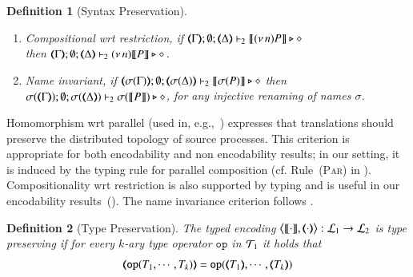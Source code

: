 \documentclass[preprint,11pt]{elsarticle}
\newtheorem{definition}{Definition}[section]
\begin{document}
{{\begin{definition}[Syntax Preservation]
\begin{enumerate}[1.]
		\item	\emph{Compositional wrt restriction},  if 
		$\mapt{\Gamma}; \emptyset; \mapt{\Delta} \proves_2 \map{\news{n}P} \hastype \Proc$ \\
		then 
		$\mapt{\Gamma}; \emptyset; \mapt{\Delta} \proves_2 \news{n}\map{P} \hastype \Proc$.
		
		\item \emph{Name invariant},   if
		$\mapt{\sigma(\Gamma)}; \emptyset; \mapt{\sigma(\Delta)} \proves_2 \map{\sigma(P)} \hastype \Proc$
		then \\
		$\sigma(\mapt{\Gamma}); \emptyset; \sigma(\mapt{\Delta}) \proves_2 \sigma(\map{P}) \hastype \Proc$, 
		for any injective renaming  of names $\sigma$.
	\end{enumerate}
\end{definition}


Homomorphism wrt parallel (used in, e.g.,~\cite{Palamidessi03,DBLP:conf/lics/PalamidessiSVV06})
expresses that translations should preserve the distributed topology of source processes. This criterion
 is appropriate for both encodability and non encodability results; in our setting, it is
induced by the typing rule for parallel composition (cf. Rule~\textsc{(Par)} in  ).
Compositionality wrt restriction 
is also supported by typing and is 
useful in our encodability results~().
The name invariance criterion follows \cite{DBLP:journals/iandc/Gorla10,DBLP:conf/icalp/LanesePSS10}. 


\begin{definition}[Type Preservation]
	\label{def:tp}
	The typed encoding 
	$\big\langle \llbracket\cdot\rrbracket, (\!\!\langle\cdot\rangle\!\!)\big\rangle: \mathcal{L}_1 \to \mathcal{L}_2$ is \emph{type preserving}
	if for every $k$-ary type operator $\mathtt{op}$ in ${\cal{T}}_1$ it holds that 
	 $$\mapt{\mathtt{op}(T_1, \cdots, T_k)} = \mathtt{op}(\mapt{T_1}, \cdots, \mapt{T_k})$$
	\end{definition}


}}
\end{document}
